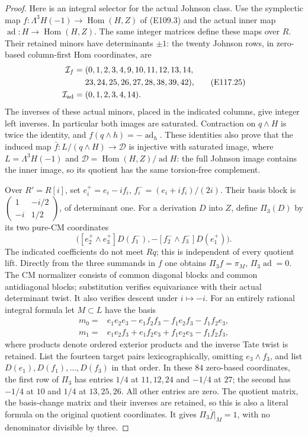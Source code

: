 \begin{proof}
Here is an integral selector for the actual Johnson class.
Use the symplectic map
$f:\Lambda^3H(-1)\to\operatorname{Hom}(H,Z)$ of (E109.3)
and the actual inner map $\operatorname{ad}:H\to\operatorname{Hom}(H,Z)$.
The same integer matrices define these maps over $R$.
Their retained minors have determinants $\pm1$:
the twenty Johnson rows, in zero-based column-first Hom
coordinates, are
\[
 \begin{aligned}
 \mathcal I_f={}&(0,1,2,3,4,9,10,11,12,13,14,\\
 &23,24,25,26,27,28,38,39,42),\\
 \mathcal I_{\rm ad}={}&(0,1,2,3,4,14).
 \end{aligned}
 \tag{E117.25}
\]
The inverses of these actual minors, placed in the indicated
columns, give integer left inverses.  In particular both
images are saturated.  Contraction on $q\wedge H$ is
twice the identity, and $f(q\wedge h)=-\operatorname{ad}_h$.
These identities also prove that the induced map
$\bar f:L/(q\wedge H)\to\mathcal D$ is injective with
saturated image, where $L=\Lambda^3H(-1)$ and
$\mathcal D=\operatorname{Hom}(H,Z)/\operatorname{ad}H$:
the full Johnson image contains the inner image, so its
quotient has the same torsion-free complement.

Over $R'=R[i]$, set
$e_i^+=e_i-if_i$, $f_i^-=(e_i+if_i)/(2i)$.
Their basis block is
$\left(\begin{smallmatrix}1&-i/2\\-i&1/2\end{smallmatrix}\right)$,
of determinant one.  For a derivation $D$ into $Z$, define
$\Pi_3(D)$ by its two pure-CM coordinates
\[
 \bigl([e_2^+\wedge e_3^+]D(f_1^-),
       -[f_2^-\wedge f_3^-]D(e_1^+)\bigr).
 \tag{E117.26}
\]
The indicated coefficients do not meet $Rq$; this is
independent of every quotient lift.  Directly from the
three summands in $f$ one obtains
$\Pi_3 f=\pi_M$, $\Pi_3\operatorname{ad}=0$.
The CM normalizer consists of common diagonal blocks and
common antidiagonal blocks; substitution verifies
equivariance with their actual determinant twist.
It also verifies descent under $i\mapsto-i$.
For an entirely rational integral formula let
$M\subset L$ have the basis
\[
 \begin{split}
 m_0={}&e_1e_2e_3-e_1f_2f_3-f_1e_2f_3-f_1f_2e_3,\\
 m_1={}&e_1e_2f_3+e_1f_2e_3+f_1e_2e_3-f_1f_2f_3,
 \end{split}
 \tag{E117.27}
\]
where products denote ordered exterior products and the
inverse Tate twist is retained.  List the fourteen target
pairs lexicographically, omitting $e_3\wedge f_3$, and list $D(e_1),D(f_1),\ldots,D(f_3)$
in that order.  In these $84$ zero-based coordinates, the
first row of $\Pi_3$ has entries $1/4$ at $11,12,24$ and
$-1/4$ at $27$; the second has $-1/4$ at $10$ and $1/4$
at $13,25,26$.  All other entries are zero.
The quotient matrix, the basis-change matrix and their
inverses are retained, so this is also a literal formula
on the original quotient coordinates.  It gives
$\Pi_3\bar f|_M=1$, with no denominator divisible by three.


\end{proof}
